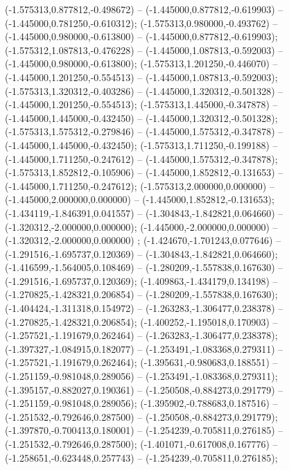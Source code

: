  (-1.575313,0.877812,-0.498672) -- (-1.445000,0.877812,-0.619903) -- (-1.445000,0.781250,-0.610312);
 (-1.575313,0.980000,-0.493762) -- (-1.445000,0.980000,-0.613800) -- (-1.445000,0.877812,-0.619903);
 (-1.575312,1.087813,-0.476228) -- (-1.445000,1.087813,-0.592003) -- (-1.445000,0.980000,-0.613800);
 (-1.575313,1.201250,-0.446070) -- (-1.445000,1.201250,-0.554513) -- (-1.445000,1.087813,-0.592003);
 (-1.575313,1.320312,-0.403286) -- (-1.445000,1.320312,-0.501328) -- (-1.445000,1.201250,-0.554513);
 (-1.575313,1.445000,-0.347878) -- (-1.445000,1.445000,-0.432450) -- (-1.445000,1.320312,-0.501328);
 (-1.575313,1.575312,-0.279846) -- (-1.445000,1.575312,-0.347878) -- (-1.445000,1.445000,-0.432450);
 (-1.575313,1.711250,-0.199188) -- (-1.445000,1.711250,-0.247612) -- (-1.445000,1.575312,-0.347878);
 (-1.575313,1.852812,-0.105906) -- (-1.445000,1.852812,-0.131653) -- (-1.445000,1.711250,-0.247612);
 (-1.575313,2.000000,0.000000) -- (-1.445000,2.000000,0.000000) -- (-1.445000,1.852812,-0.131653);
 (-1.434119,-1.846391,0.041557) -- (-1.304843,-1.842821,0.064660) -- (-1.320312,-2.000000,0.000000);
 (-1.445000,-2.000000,0.000000) -- (-1.320312,-2.000000,0.000000) ;
 (-1.424670,-1.701243,0.077646) -- (-1.291516,-1.695737,0.120369) -- (-1.304843,-1.842821,0.064660);
 (-1.416599,-1.564005,0.108469) -- (-1.280209,-1.557838,0.167630) -- (-1.291516,-1.695737,0.120369);
 (-1.409863,-1.434179,0.134198) -- (-1.270825,-1.428321,0.206854) -- (-1.280209,-1.557838,0.167630);
 (-1.404424,-1.311318,0.154972) -- (-1.263283,-1.306477,0.238378) -- (-1.270825,-1.428321,0.206854);
 (-1.400252,-1.195018,0.170903) -- (-1.257521,-1.191679,0.262464) -- (-1.263283,-1.306477,0.238378);
 (-1.397327,-1.084915,0.182077) -- (-1.253491,-1.083368,0.279311) -- (-1.257521,-1.191679,0.262464);
 (-1.395631,-0.980683,0.188551) -- (-1.251159,-0.981048,0.289056) -- (-1.253491,-1.083368,0.279311);
 (-1.395157,-0.882027,0.190361) -- (-1.250508,-0.884273,0.291779) -- (-1.251159,-0.981048,0.289056);
 (-1.395902,-0.788683,0.187516) -- (-1.251532,-0.792646,0.287500) -- (-1.250508,-0.884273,0.291779);
 (-1.397870,-0.700413,0.180001) -- (-1.254239,-0.705811,0.276185) -- (-1.251532,-0.792646,0.287500);
 (-1.401071,-0.617008,0.167776) -- (-1.258651,-0.623448,0.257743) -- (-1.254239,-0.705811,0.276185);
